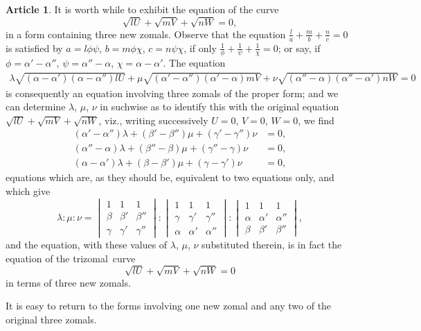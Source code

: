 \documentclass[11pt,a4paper]{article}
\theoremstyle{definition}
\newtheorem{art}{Article}
\newcommand{\trizomal}{trizomal}
\begin{document}
\begin{art}
It is worth while to exhibit the equation of the curve
\[
\sqrt{lU} + \sqrt{mV} + \sqrt{nW} = 0,
\]
in a form containing three new zomals. Observe that the equation $\tfrac{l}{a} + \tfrac{m}{b} + \tfrac{n}{c} = 0$ is satisfied by $a = l\phi\psi$, $b = m\phi\chi$, $c = n\psi\chi$, if only $\tfrac{1}{\phi} + \tfrac{1}{\psi} + \tfrac{1}{\chi} = 0$; or say, if $\phi = \alpha' - \alpha''$, $\psi = \alpha'' - \alpha$, $\chi = \alpha - \alpha'$. The equation
\begin{multline*}
\lambda\sqrt{(\alpha - \alpha')(\alpha - \alpha'')lU} + \mu\sqrt{(\alpha' - \alpha'')(\alpha' - \alpha)mV} + \nu\sqrt{(\alpha'' - \alpha)(\alpha'' - \alpha')nW} = 0
\end{multline*}
is consequently an equation involving three zomals of the proper form; and we can determine $\lambda$, $\mu$, $\nu$ in suchwise as to identify this with the original equation $\sqrt{lU} + \sqrt{mV} + \sqrt{nW}$, viz., writing successively $U = 0$, $V = 0$, $W = 0$, we find
\begin{align*}
(\alpha' - \alpha'')\lambda + (\beta' - \beta'')\mu + (\gamma' - \gamma'')\nu &= 0, \\
(\alpha'' - \alpha)\lambda + (\beta'' - \beta)\mu + (\gamma'' - \gamma)\nu &= 0, \\
(\alpha - \alpha')\lambda + (\beta - \beta')\mu + (\gamma - \gamma')\nu &= 0,
\end{align*}
equations which are, as they should be, equivalent to two equations only, and which give
\[
\lambda : \mu : \nu = \begin{vmatrix} 1 & 1 & 1 \\ \beta & \beta' & \beta'' \\ \gamma & \gamma' & \gamma'' \end{vmatrix} : \begin{vmatrix} 1 & 1 & 1 \\ \gamma & \gamma' & \gamma'' \\ \alpha & \alpha' & \alpha'' \end{vmatrix} : \begin{vmatrix} 1 & 1 & 1 \\ \alpha & \alpha' & \alpha'' \\ \beta & \beta' & \beta'' \end{vmatrix},
\]
and the equation, with these values of $\lambda$, $\mu$, $\nu$ substituted therein, is in fact the equation of the \trizomal\ curve
\[
\sqrt{lU} + \sqrt{mV} + \sqrt{nW} = 0
\]
in terms of three new zomals.

It is easy to return to the forms involving one new zomal and any two of the original three zomals.
\end{art}
\end{document}
